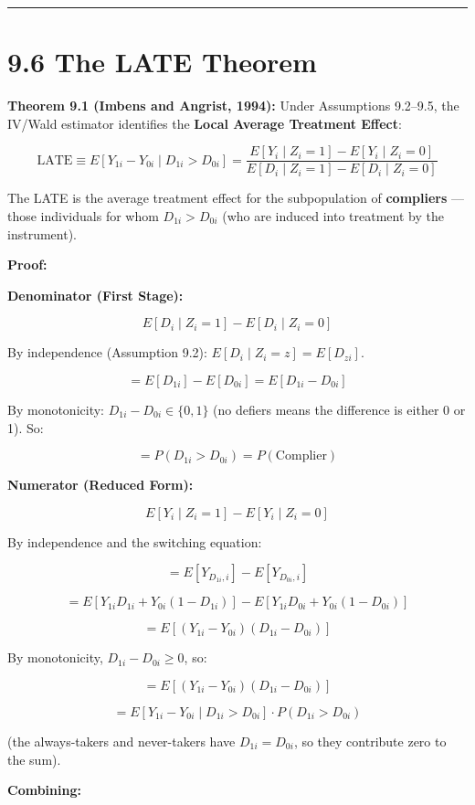 \medskip\hrule\medskip

\section{9.6 The LATE Theorem}

\textbf{Theorem 9.1 (Imbens and Angrist, 1994):} Under Assumptions 9.2--9.5, the IV/Wald estimator identifies the \textbf{Local Average Treatment Effect}:

\[
\text{LATE} \equiv E[Y_{1i} - Y_{0i} \mid D_{1i} > D_{0i}] = \frac{E[Y_i \mid Z_i = 1] - E[Y_i \mid Z_i = 0]}{E[D_i \mid Z_i = 1] - E[D_i \mid Z_i = 0]}
\]

The LATE is the average treatment effect for the subpopulation of \textbf{compliers} --- those individuals for whom $D_{1i} > D_{0i}$ (who are induced into treatment by the instrument).

\textbf{Proof:}

\textbf{Denominator (First Stage):}

\[
E[D_i \mid Z_i = 1] - E[D_i \mid Z_i = 0]
\]

By independence (Assumption 9.2): $E[D_i \mid Z_i = z] = E[D_{zi}]$.

\[
= E[D_{1i}] - E[D_{0i}] = E[D_{1i} - D_{0i}]
\]

By monotonicity: $D_{1i} - D_{0i} \in \{0, 1\}$ (no defiers means the difference is either 0 or 1). So:

\[
= P(D_{1i} > D_{0i}) = P(\text{Complier})
\]

\textbf{Numerator (Reduced Form):}

\[
E[Y_i \mid Z_i = 1] - E[Y_i \mid Z_i = 0]
\]

By independence and the switching equation:

\[
= E[Y_{D_{1i}, i}] - E[Y_{D_{0i}, i}]
\]

\[
= E[Y_{1i} D_{1i} + Y_{0i}(1-D_{1i})] - E[Y_{1i} D_{0i} + Y_{0i}(1-D_{0i})]
\]

\[
= E[(Y_{1i} - Y_{0i})(D_{1i} - D_{0i})]
\]

By monotonicity, $D_{1i} - D_{0i} \geq 0$, so:

\[
= E[(Y_{1i} - Y_{0i})(D_{1i} - D_{0i})]
\]

\[
= E[Y_{1i} - Y_{0i} \mid D_{1i} > D_{0i}] \cdot P(D_{1i} > D_{0i})
\]

(the always-takers and never-takers have $D_{1i} = D_{0i}$, so they contribute zero to the sum).

\textbf{Combining:}

